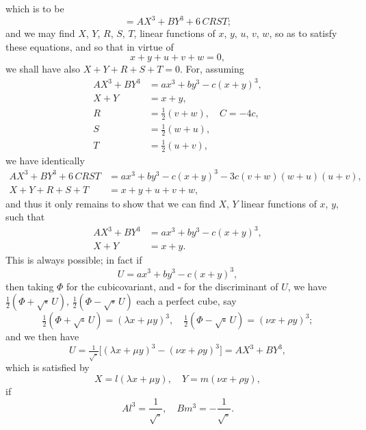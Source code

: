 \documentclass[11pt,a4paper]{article}
\theoremstyle{plain}
\begin{document}
which is to be
\[
= AX^3 + BY^3 + 6\,CRST;
\]
and we may find $X$, $Y$, $R$, $S$, $T$, linear functions of $x$, $y$, $u$, $v$, $w$, so as to satisfy these equations, and so that in virtue of
\[
x + y + u + v + w = 0,
\]
we shall have also $X + Y + R + S + T = 0$. For, assuming
\begin{align*}
AX^3 + BY^3 &= a x^3 + b y^3 - c(x + y)^3,\\
X + Y &= x + y,\\
R &= \tfrac{1}{2}(v + w),\quad C = -4c,\\
S &= \tfrac{1}{2}(w + u),\\
T &= \tfrac{1}{2}(u + v),
\end{align*}
we have identically
\begin{align*}
AX^3 + BY^3 + 6\,CRST &= a x^3 + b y^3 - c(x + y)^3 - 3c(v + w)(w + u)(u + v),\\
X + Y + R + S + T &= x + y + u + v + w,
\end{align*}
and thus it only remains to show that we can find $X$, $Y$ linear functions of $x$, $y$, such that
\begin{align*}
AX^3 + BY^3 &= a x^3 + b y^3 - c(x + y)^3,\\
X + Y &= x + y.
\end{align*}
This is always possible; in fact if
\[
U = a x^3 + b y^3 - c(x + y)^3,
\]
then taking $\Phi$ for the cubicovariant, and $\square$ for the discriminant of $U$, we have $\tfrac{1}{2}(\Phi + \sqrt{\square}\,U)$, $\tfrac{1}{2}(\Phi - \sqrt{\square}\,U)$ each a perfect cube, say
\[
\tfrac{1}{2}(\Phi + \sqrt{\square}\,U) = (\lambda x + \mu y)^3,\quad \tfrac{1}{2}(\Phi - \sqrt{\square}\,U) = (\nu x + \rho y)^3;
\]
and we then have
\[
U = \tfrac{1}{\sqrt{\square}}\bigl[(\lambda x + \mu y)^3 - (\nu x + \rho y)^3\bigr] = AX^3 + BY^3,
\]
which is satisfied by
\[
X = l(\lambda x + \mu y),\quad Y = m(\nu x + \rho y),
\]
if
\[
A l^3 = \frac{1}{\sqrt{\square}},\quad B m^3 = -\frac{1}{\sqrt{\square}}.
\]
\end{document}
